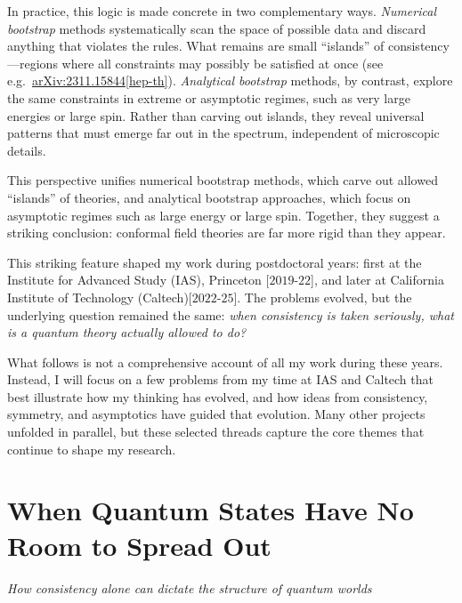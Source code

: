 \documentclass[11pt, oneside]{article}
\begin{document}
In practice, this logic is made concrete in two complementary ways. \emph{Numerical bootstrap} methods
systematically scan the space of possible data and discard anything that violates the rules. What
remains are small ``islands'' of consistency—regions where all constraints may possibly be satisfied at once (see  e.g.\  \href{https://arxiv.org/abs/2311.15844}{arXiv:2311.15844[hep-th]}).
\emph{Analytical bootstrap} methods, by contrast, explore the same constraints in extreme or asymptotic
regimes, such as very large energies or large spin. Rather than carving out islands, they reveal
universal patterns that must emerge far out in the spectrum, independent of microscopic details.





This perspective unifies numerical bootstrap methods, which carve out allowed ``islands'' of theories,
and analytical bootstrap approaches, which focus on asymptotic regimes such as large energy or large
spin. Together, they suggest a striking
conclusion: conformal field theories are far more rigid than they appear.






This striking feature shaped my work during postdoctoral years: first at the Institute for Advanced Study (IAS), Princeton [$2019$-$22$], and later at California Institute of Technology (Caltech)[$2022$-$25$].
The problems evolved, but the underlying question remained the same: \emph{when consistency is taken
seriously, what is a quantum theory actually allowed to do?}



What follows is not a comprehensive account of all my work during these years. Instead, I will focus on a few problems from my time at IAS and Caltech that best illustrate how my thinking has evolved, and how ideas from consistency, symmetry, and asymptotics have guided that evolution. Many other projects unfolded in parallel, but these selected threads capture the core themes that continue to shape my research.

\section*{When Quantum States Have No Room to Spread Out}


\textit{How consistency alone can dictate the structure of quantum worlds}
\end{document}

